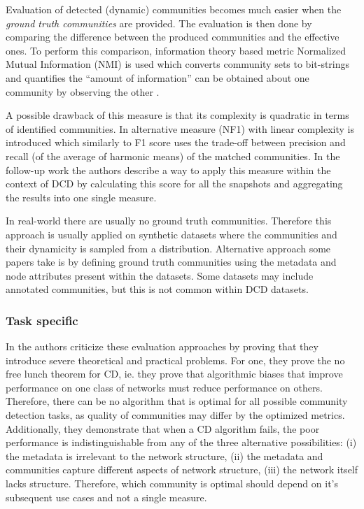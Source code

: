 \documentclass[
acmsmall,
nonacm,
screen,
acmthm]{../../scripts/pandoc/templates/acmart}
\begin{document}
Evaluation of detected (dynamic) communities becomes much easier when
the \emph{ground truth communities} are provided. The evaluation is then
done by comparing the difference between the produced communities and
the effective ones. To perform this comparison, information theory based
metric Normalized Mutual Information (NMI) is used which converts
community sets to bit-strings and quantifies the ``amount of
information'' can be obtained about one community by observing the other
\citep{lancichinettiDetectingOverlappingHierarchical2009}.

A possible drawback of this measure is that its complexity is quadratic
in terms of identified communities. In
\citep{rossettiNovelApproachEvaluate2016} alternative measure (NF1) with
linear complexity is introduced which similarly to F1 score uses the
trade-off between precision and recall (of the average of harmonic
means) of the matched communities. In the follow-up work
\citep{rossettiANGELEfficientEffective2020} the authors describe a way
to apply this measure within the context of DCD by calculating this
score for all the snapshots and aggregating the results into one single
measure.

In real-world there are usually no ground truth communities. Therefore
this approach is usually applied on synthetic datasets where the
communities and their dynamicity is sampled from a distribution.
Alternative approach some papers take is by defining ground truth
communities using the metadata and node attributes present within the
datasets. Some datasets may include annotated communities, but this is
not common within DCD datasets.

\hypertarget{task-specific}{%
\subsubsection{Task specific}\label{task-specific}}

In \citep{peelGroundTruthMetadata2017} the authors criticize these
evaluation approaches by proving that they introduce severe theoretical
and practical problems. For one, they prove the no free lunch theorem
for CD, ie. they prove that algorithmic biases that improve performance
on one class of networks must reduce performance on others. Therefore,
there can be no algorithm that is optimal for all possible community
detection tasks, as quality of communities may differ by the optimized
metrics. Additionally, they demonstrate that when a CD algorithm fails,
the poor performance is indistinguishable from any of the three
alternative possibilities: (i) the metadata is irrelevant to the network
structure, (ii) the metadata and communities capture different aspects
of network structure, (iii) the network itself lacks structure.
Therefore, which community is optimal should depend on it's subsequent
use cases and not a single measure.
\end{document}
